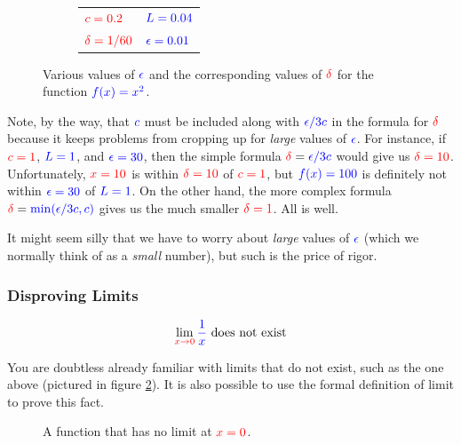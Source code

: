 \documentclass{myarticle}
\newcommand{\hor}[1]{\textcolor{red}{#1}}
\newcommand{\ver}[1]{\textcolor{blue}{#1}}
\theoremstyle{nospace}
\newtheorem{old series theorem}{Theorem}
\newenvironment{series theorem}
{\begin{mdframed}\begin{old series theorem}}
    {\end{old series theorem}\end{mdframed}}
\begin{document}
\begin{figure}[htb!]
\begin{subfigure}[t]{0.3\textwidth}
    \small
    \begin{tabular}{ll}
      $\hor{c      = 0.2 }$ & $\ver{       L = 0.04}$ \\
      $\hor{\delta = 1/60}$ & $\ver{\epsilon = 0.01}$ \\
    \end{tabular}
  \end{subfigure}
  \caption{Various values of $\ver{\epsilon}$ and the corresponding
    values of $\hor{\delta}$ for the function $\ver{f(x) = x^2}$.}
  \label{fig:quadratics}
\end{figure}

Note, by the way, that $\ver{c}$ must be included along with
$\ver{\epsilon/3c}$ in the formula for $\hor{\delta}$ because it keeps
problems from cropping up for \emph{large} values of $\ver{\epsilon}$.
For instance, if $\hor{c = 1}$, $\ver{L = 1}$, and
$\ver{\epsilon = 30}$, then the simple formula
$\hor{\delta} = \ver{\epsilon/3c}$ would give us $\hor{\delta = 10}$.
Unfortunately, $\hor{x = 10}$ is within $\hor{\delta = 10}$ of
$\hor{c = 1}$, but $\ver{f(x) = 100}$ is definitely not within
$\ver{\epsilon = 30}$ of $\ver{L = 1}$. On the other hand, the more
complex formula $\hor{\delta} = \ver{\min(\epsilon/3c, c)}$ gives us
the much smaller $\hor{\delta = 1}$. All is well.

It might seem silly that we have to worry about \emph{large} values of
$\ver{\epsilon}$ (which we normally think of as a \emph{small}
number), but such is the price of rigor.

\subsubsection{Disproving Limits}
\label{sec:disproving limits}

\[
  \lim_{\hor{x \to 0}} \ver{\frac{1}{x}}\text{ does not exist}
\]

You are doubtless already familiar with limits that do not exist, such
as the one above (pictured in figure \ref{fig:dne}). It is also
possible to use the formal definition of limit to prove this fact.

\begin{figure}[htb!] \centering
  \caption{A function that has no limit at $\hor{x = 0}$.}
  \label{fig:dne}
\end{figure}
\end{document}
